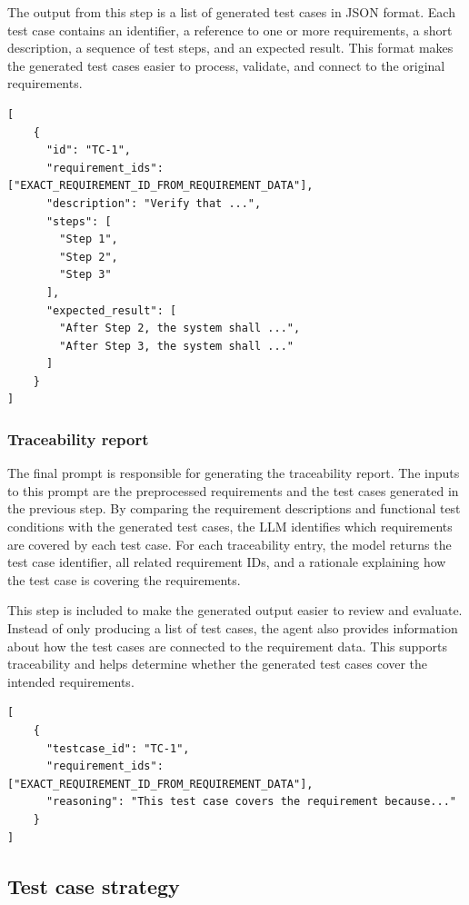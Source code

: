 \documentclass[a4paper,12pt]{article}
\begin{document}
The output from this step is a list of generated test cases in JSON format. Each test case contains an identifier, a reference to one or more requirements, a short description, a sequence of test steps, and an expected result. This format makes the generated test cases easier to process, validate, and connect to the original requirements.

\begin{lstlisting}[style=pythonstyle, caption={Test case format.}, label={lst:test_generation}]
[
    {
      "id": "TC-1",
      "requirement_ids": ["EXACT_REQUIREMENT_ID_FROM_REQUIREMENT_DATA"],
      "description": "Verify that ...",
      "steps": [
        "Step 1",
        "Step 2",
        "Step 3"
      ],
      "expected_result": [
        "After Step 2, the system shall ...",
        "After Step 3, the system shall ..."
      ]
    }
]
\end{lstlisting}

\newpage
\subsubsection{Traceability report}
The final prompt is responsible for generating the traceability report. The inputs to this prompt are the preprocessed requirements and the test cases generated in the previous step. By comparing the requirement descriptions and functional test conditions with the generated test cases, the LLM identifies which requirements are covered by each test case. For each traceability entry, the model returns the test case identifier, all related requirement IDs, and a rationale explaining how the test case is covering the requirements.

This step is included to make the generated output easier to review and evaluate. Instead of only producing a list of test cases, the agent also provides information about how the test cases are connected to the requirement data. This supports traceability and helps determine whether the generated test cases cover the intended requirements.

\begin{lstlisting}[style=pythonstyle, caption={Traceability report format.}, label={lst:traceability_report}]
[
    {
      "testcase_id": "TC-1",
      "requirement_ids": ["EXACT_REQUIREMENT_ID_FROM_REQUIREMENT_DATA"],
      "reasoning": "This test case covers the requirement because..."
    }
]
\end{lstlisting}


\subsection{Test case strategy}
\end{document}
